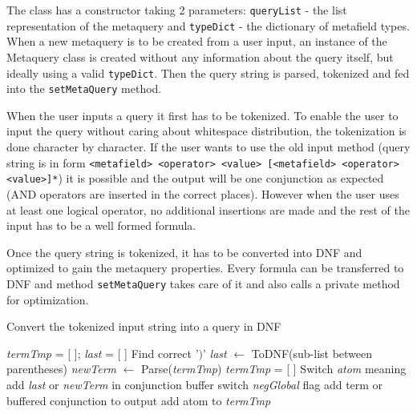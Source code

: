 The class has a constructor taking 2 parameters: \texttt{queryList} - the list representation of the 
metaquery and \texttt{typeDict} - the dictionary of metafield types. When a new metaquery is to be 
created from a user input, an instance of the Metaquery class is created without any information
about the query itself, but ideally using a valid \texttt{typeDict}. Then the query string is parsed, 
tokenized and fed into the \texttt{setMetaQuery} method.


When the user inputs a query it first has to be tokenized. To enable the user to input the query without caring 
about whitespace distribution, the tokenization is done character by character.
If the user wants to use the old input method (query string is in form 
\texttt{<metafield> <operator> <value> [<metafield> <operator> <value>]*})
it is possible and the output will be one conjunction as expected (AND operators are inserted in the
correct places). However when the user uses at least one logical operator, no additional insertions are made
and the rest of the input has to be a well formed formula. 

Once the query string is tokenized, it has to be converted into DNF and optimized to gain the metaquery 
properties. Every formula can be transferred to DNF and  method \texttt{setMetaQuery} takes care of it and also 
calls a private method for optimization.

\begin{algorithm}[h]
\caption{Convert the tokenized input string into a query in DNF}
\begin{algorithmic}[1]
\State \textit{termTmp} = [ ]; \textit{last} = [ ]
		\State Find correct '$)$'
		\State \textit{last} $\leftarrow$ ToDNF(sub-list between parentheses)
			\State \textit{newTerm} $\leftarrow$ Parse(\textit{termTmp})
			\State \textit{termTmp} = [ ]
			\State Switch \textit{atom} meaning
		\EndIf
			\State add \textit{last} or \textit{newTerm} in conjunction buffer
			\State switch \textit{negGlobal} flag
		\Else{}
			\State add term or buffered conjunction to output
		\EndIf
	\Else
		\State add atom to \textit{termTmp}
	\EndIf
\EndFor
\EndProcedure
\end{algorithmic}
\end{algorithm}


